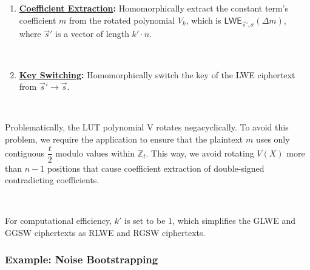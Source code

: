 \begin{tcolorbox}[title={\textbf{\tboxlabel{\ref*{subsec:tfhe-summary}} TFHE Noise Bootstrapping Procedure}}]
\begin{enumerate}
$ $

\item \textbf{\underline{Coefficient Extraction}:} Homomorphically extract the constant term's coefficient $m$ from the rotated polynomial $V_k$, which is $\textsf{LWE}_{\vec{s}', \sigma}(\Delta m)$, where $\vec{s}'$ is a vector of length $k' \cdot n$. 

$ $

\item \textbf{\underline{Key Switching}:} Homomorphically switch the key of the LWE ciphertext from $\vec{s}' \rightarrow \vec{s}$. 





\end{enumerate}

$ $

 Problematically, the LUT polynomial V rotates negacyclically. To avoid this problem, we require the application to ensure that the plaintext $m$ uses only contiguous $\dfrac{t}{2}$ modulo values within $\mathbb{Z}_t$. This way, we avoid rotating $V(X)$ more than $n-1$ positions that cause coefficient extraction of double-signed contradicting coefficients. 

$ $

 For computational efficiency, $k'$ is set to be 1, which simplifies the GLWE and GGSW ciphertexts as RLWE and RGSW ciphertexts.  
\end{tcolorbox}


\subsubsection{Example: Noise Bootstrapping}
\label{subsec:tfhe-noise-bootstrapping-ex}

